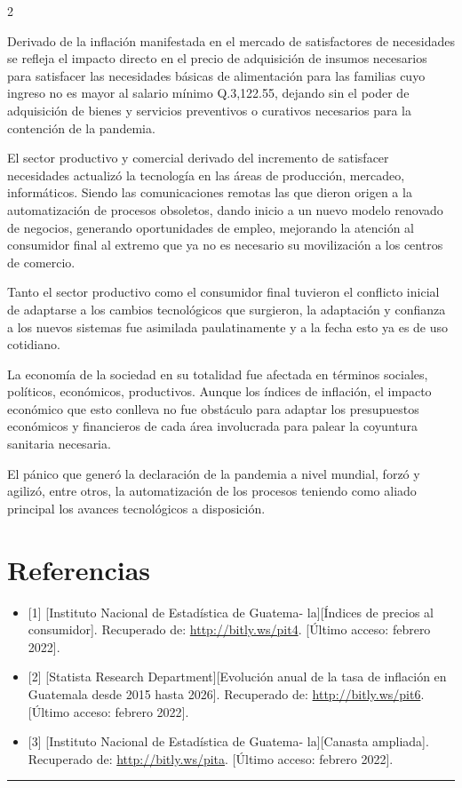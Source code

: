 \documentclass[12pt,spanish,Letterpaper,openany]{book}
\newcommand{\HRule}{\begin{center}\rule{0.5\linewidth}{0.2mm}\end{center}}
\begin{document}
\begin {multicols}{2}
\begin {flushleft}
\begin{minipage}[c]{\columnwidth}
\end{minipage}
\end {flushleft}

Derivado de la inflación manifestada en el mercado de satisfactores de necesidades se refleja el impacto directo en el precio de adquisición de insumos necesarios para satisfacer las necesidades básicas de alimentación para las familias cuyo ingreso no es mayor al salario mínimo Q.3,122.55, dejando sin el poder de adquisición de bienes y servicios preventivos o curativos necesarios para la contención de la pandemia.

El sector productivo y comercial derivado del incremento de satisfacer necesidades actualizó la tecnología en las áreas de producción, mercadeo, informáticos. Siendo las comunicaciones remotas las que dieron origen a la automatización de procesos obsoletos, dando inicio a un nuevo modelo renovado de negocios, generando oportunidades de empleo, mejorando la atención al consumidor final al extremo que ya no es necesario su movilización a los centros de comercio.

Tanto el sector productivo como el consumidor final tuvieron el conflicto inicial de adaptarse a los cambios tecnológicos que surgieron, la adaptación y confianza a los nuevos sistemas fue asimilada paulatinamente y a la fecha esto ya es de uso cotidiano.

La economía de la sociedad en su totalidad fue afectada en términos sociales, políticos, económicos, productivos. Aunque los índices de inflación, el impacto económico que esto conlleva no fue obstáculo para adaptar los presupuestos económicos y financieros de cada área involucrada para palear la coyuntura sanitaria necesaria.

El pánico que generó la declaración de la pandemia a nivel mundial, forzó y agilizó, entre otros, la automatización de los procesos teniendo como aliado principal los avances tecnológicos a disposición.

\hypertarget{referencias-18}{%
\section*{Referencias}\label{referencias-18}}

\begin{itemize}
\item
  {[}1{]} {[}Instituto Nacional de Estadística de Guatema-
  la{]}{[}Índices de precios al consumidor{]}. Recuperado de: \url{http://bitly.ws/pit4}. {[}Último acceso: febrero 2022{]}.
\item
  {[}2{]} {[}Statista Research Department{]}{[}Evolución anual de la tasa de inflación en Guatemala desde 2015 hasta 2026{]}. Recuperado de: \url{http://bitly.ws/pit6}. {[}Último acceso: febrero 2022{]}.
\item
  {[}3{]} {[}Instituto Nacional de Estadística de Guatema-
  la{]}{[}Canasta ampliada{]}. Recuperado de: \url{http://bitly.ws/pita}. {[}Último acceso: febrero 2022{]}.
\end{itemize}

\end {multicols}
\medskip
\HRule
\medskip
\end{document}
